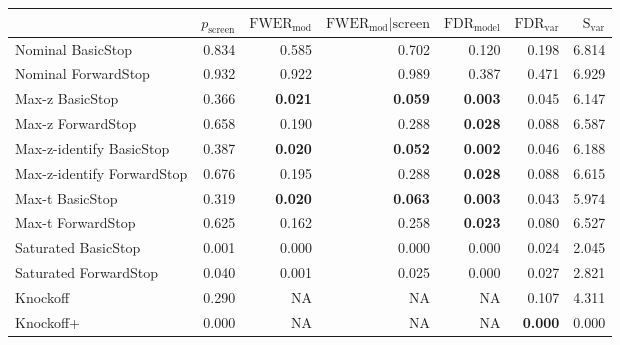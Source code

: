 
\newcommand{\guarantee}[1]{{\bf #1}}
\begin{tabular}{|l|rrrrrr|}
 \hline
{} &  $p_{\text{screen}}$ &  $\text{FWER}_{\text{mod}}$ &  $\text{FWER}_{\text{mod}} \vert \text{screen}$ &  $\text{FDR}_{\text{model}}$ &  $\text{FDR}_{\text{var}}$ &  $\text{S}_{\text{var}}$ \\ \hline
Nominal BasicStop & 0.834 & 0.585 & 0.702 & 0.120 & 0.198 & 6.814 \\ 
Nominal ForwardStop & 0.932 & 0.922 & 0.989 & 0.387 & 0.471 & 6.929 \\ 
Max-z BasicStop & 0.366 & \guarantee{0.021} & \guarantee{0.059} & \guarantee{0.003} & 0.045 & 6.147 \\ 
Max-z ForwardStop & 0.658 & 0.190 & 0.288 & \guarantee{0.028} & 0.088 & 6.587 \\ 
Max-z-identify BasicStop & 0.387 & \guarantee{0.020} & \guarantee{0.052} & \guarantee{0.002} & 0.046 & 6.188 \\ 
Max-z-identify ForwardStop & 0.676 & 0.195 & 0.288 & \guarantee{0.028} & 0.088 & 6.615 \\ 
Max-t BasicStop & 0.319 & \guarantee{0.020} & \guarantee{0.063} & \guarantee{0.003} & 0.043 & 5.974 \\ 
Max-t ForwardStop & 0.625 & 0.162 & 0.258 & \guarantee{0.023} & 0.080 & 6.527 \\ 
Saturated BasicStop & 0.001 & 0.000 & 0.000 & 0.000 & 0.024 & 2.045 \\ 
Saturated ForwardStop & 0.040 & 0.001 & 0.025 & 0.000 & 0.027 & 2.821 \\ 
Knockoff & 0.290 & NA & NA & NA & 0.107 & 4.311 \\ 
Knockoff+ & 0.000 & NA & NA & NA & \guarantee{0.000} & 0.000 \\   \hline
\end{tabular}
